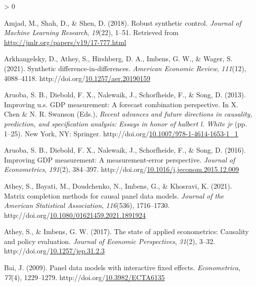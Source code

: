 \documentclass[12pt,nobind, a4paper]{reedthesis}
\newlength{\cslhangindent}
\newenvironment{CSLReferences}[2] %
{%
	\setlength{\parindent}{0pt}
	\ifodd #1 \everypar{\setlength{\hangindent}{\cslhangindent}}\ignorespaces\fi
	\ifnum #2 > 0
	\setlength{\parskip}{#2\baselineskip}
	\fi
}%
{}
\begin{document}
\begin{CSLReferences}{1}{0}
 \leavevmode\hypertarget{ref-amjad_robust_2018}{}%
 Amjad, M., Shah, D., \& Shen, D. (2018). Robust synthetic control. \emph{Journal of Machine Learning Research}, \emph{19}(22), 1--51. Retrieved from \url{http://jmlr.org/papers/v19/17-777.html}

 \leavevmode\hypertarget{ref-arkhangelsky_synthetic_2021}{}%
 Arkhangelsky, D., Athey, S., Hirshberg, D. A., Imbens, G. W., \& Wager, S. (2021). Synthetic difference-in-differences. \emph{American Economic Review}, \emph{111}(12), 4088--4118. http://doi.org/\href{https://doi.org/10.1257/aer.20190159}{10.1257/aer.20190159}

 \leavevmode\hypertarget{ref-aruoba_improving_2013}{}%
 Aruoba, S. B., Diebold, F. X., Nalewaik, J., Schorfheide, F., \& Song, D. (2013). Improving u.s. {GDP} measurement: A forecast combination perspective. In X. Chen \& N. R. Swanson (Eds.), \emph{Recent advances and future directions in causality, prediction, and specification analysis: Essays in honor of halbert l. White jr} (pp. 1--25). New York, {NY}: Springer. http://doi.org/\href{https://doi.org/10.1007/978-1-4614-1653-1_1}{10.1007/978-1-4614-1653-1\_1}

 \leavevmode\hypertarget{ref-aruoba_improving_2016}{}%
 Aruoba, S. B., Diebold, F. X., Nalewaik, J., Schorfheide, F., \& Song, D. (2016). Improving {GDP} measurement: A measurement-error perspective. \emph{Journal of Econometrics}, \emph{191}(2), 384--397. http://doi.org/\href{https://doi.org/10.1016/j.jeconom.2015.12.009}{10.1016/j.jeconom.2015.12.009}

 \leavevmode\hypertarget{ref-athey_matrix_2021}{}%
 Athey, S., Bayati, M., Doudchenko, N., Imbens, G., \& Khosravi, K. (2021). Matrix completion methods for causal panel data models. \emph{Journal of the American Statistical Association}, \emph{116}(536), 1716--1730. http://doi.org/\href{https://doi.org/10.1080/01621459.2021.1891924}{10.1080/01621459.2021.1891924}

 \leavevmode\hypertarget{ref-athey_state_2017}{}%
 Athey, S., \& Imbens, G. W. (2017). The state of applied econometrics: Causality and policy evaluation. \emph{Journal of Economic Perspectives}, \emph{31}(2), 3--32. http://doi.org/\href{https://doi.org/10.1257/jep.31.2.3}{10.1257/jep.31.2.3}

 \leavevmode\hypertarget{ref-bai_panel_2009}{}%
 Bai, J. (2009). Panel data models with interactive fixed effects. \emph{Econometrica}, \emph{77}(4), 1229--1279. http://doi.org/\href{https://doi.org/10.3982/ECTA6135}{10.3982/ECTA6135}


\end{CSLReferences}
\end{document}

